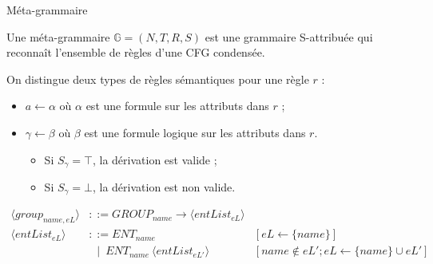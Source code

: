 \begin{frame}{Méta-grammaire}
    \begin{definition}
        Une méta-grammaire $\mathbb{G} = (N, T, R, S)$ est une grammaire S-attribuée qui reconnaît l'ensemble de règles d'une CFG condensée.

        On distingue deux types de règles sémantiques pour une règle $r$ :
        \begin{itemize}
            \item $a \gets \alpha$ %
                  où $\alpha$ est une formule sur les attributs dans $r$ ;
            \item $\gamma \gets \beta$ où $\beta$ est une formule logique sur les attributs dans $r$.
                  \pause
                  \begin{itemize}
                      \item Si $S_\gamma = \top$, la dérivation est valide ;
                      \item Si $S_\gamma = \bot$, la dérivation est non valide.
                  \end{itemize}
        \end{itemize}
    \end{definition}
    \pause
    \small
    \begin{align*}
        \langle group_{name, eL} \rangle & ::= GROUP_{name} \to \langle entList_{eL} \rangle                                                    \\
        \langle entList_{eL} \rangle     & ::= ENT_{name}                                       & [eL \gets \{name\}]                           \\
                                         & ~~ \mid ~ ENT_{name} ~ \langle entList_{eL'} \rangle & [name \notin eL'; eL \gets \{name\} \cup eL']
    \end{align*}
\end{frame}

